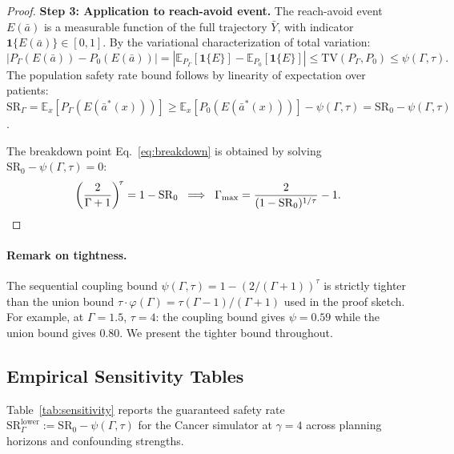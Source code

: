 \documentclass{article}
\newcommand{\E}{\mathbb{E}}
\newcommand{\TV}{\mathrm{TV}}
\newcommand{\ba}{\bar{a}}
\newcommand{\ind}{\mathbf{1}}
\newcommand{\bY}{\bar{Y}}
\begin{document}
\begin{proof}
\textbf{Step 3: Application to reach-avoid event.}
The reach-avoid event $E(\ba)$ is a measurable function of the full trajectory $\bY$, with indicator $\ind\{E(\ba)\} \in [0,1]$. By the variational characterization of total variation:
\[
|P_\Gamma(E(\ba)) - P_0(E(\ba))| = |\E_{P_\Gamma}[\ind\{E\}] - \E_{P_0}[\ind\{E\}]| \leq \TV(P_\Gamma, P_0) \leq \psi(\Gamma, \tau).
\]
The population safety rate bound follows by linearity of expectation over patients:
$\mathrm{SR}_\Gamma = \E_x[P_\Gamma(E(\ba^*(x)))] \geq \E_x[P_0(E(\ba^*(x)))] - \psi(\Gamma, \tau) = \mathrm{SR}_0 - \psi(\Gamma, \tau)$.

The breakdown point Eq.~\eqref{eq:breakdown} is obtained by solving $\mathrm{SR}_0 - \psi(\Gamma, \tau) = 0$:
\[
\left(\frac{2}{\Gamma+1}\right)^{\!\tau} = 1 - \mathrm{SR}_0 \;\;\Longrightarrow\;\; \Gamma_{\max} = \frac{2}{(1 - \mathrm{SR}_0)^{1/\tau}} - 1. \qedhere
\]
\end{proof}

\paragraph{Remark on tightness.} The sequential coupling bound $\psi(\Gamma, \tau) = 1 - (2/(\Gamma+1))^\tau$ is strictly tighter than the union bound $\tau \cdot \varphi(\Gamma) = \tau(\Gamma-1)/(\Gamma+1)$ used in the proof sketch. For example, at $\Gamma = 1.5$, $\tau = 4$: the coupling bound gives $\psi = 0.59$ while the union bound gives $0.80$. We present the tighter bound throughout.

\subsection{Empirical Sensitivity Tables}

Table~\ref{tab:sensitivity} reports the guaranteed safety rate $\mathrm{SR}_\Gamma^{\mathrm{lower}} := \mathrm{SR}_0 - \psi(\Gamma, \tau)$ for the Cancer simulator at $\gamma = 4$ across planning horizons and confounding strengths.
\end{document}
